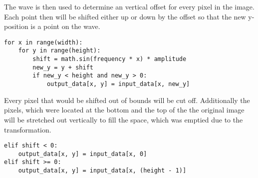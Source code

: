 The wave is then used to determine an vertical offset for every pixel in the image. Each point then will be shifted either up or down by the offset so that the new y-position is a point on the wave. 

\clearpage

\begin{lstlisting}[style=std]
for x in range(width):
	for y in range(height):
		shift = math.sin(frequency * x) * amplitude
		new_y = y + shift
		if new_y < height and new_y > 0:
			output_data[x, y] = input_data[x, new_y]
\end{lstlisting}

Every pixel that would be shifted out of bounds will be cut off. Additionally the pixels, which were located at the bottom and the top of the the original image will be stretched out vertically to fill the space, which was emptied due to the transformation.

\begin{lstlisting}[style=std]
elif shift < 0:
	output_data[x, y] = input_data[x, 0]
elif shift >= 0:
	output_data[x, y] = input_data[x, (height - 1)]
\end{lstlisting}

\clearpage
